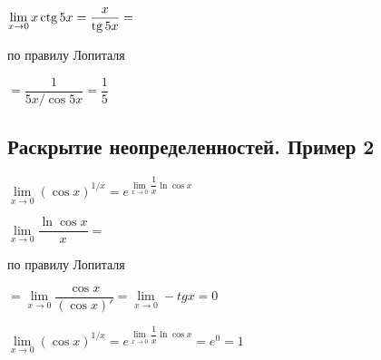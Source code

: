 $ \lim\limits_{x \to 0} x \operatorname{ctg} 5x = \dfrac{x}{\operatorname{tg} 5x} = $

по правилу Лопиталя

$ = \dfrac{1}{5x/\cos 5x} = \dfrac{1}{5} $

\subsection{Раскрытие неопределенностей. Пример 2}

$ \lim\limits_{x \to 0} (\cos x)^{1/x} = e^{\lim\limits_{x \to 0} \dfrac{1}{x} \ln \cos x} $

$ \lim\limits_{x \to 0} \dfrac{\ln \cos x}{x} =  $

по правилу Лопиталя

$ = \lim\limits_{x \to 0} \dfrac{\cos x}{(\cos x)'} = \lim\limits_{x \to 0} -tg x = 0 $

$ \lim\limits_{x \to 0} (\cos x)^{1/x} = e^{\lim\limits_{x \to 0} \dfrac{1}{x} \ln \cos x} = e^{0} = 1$